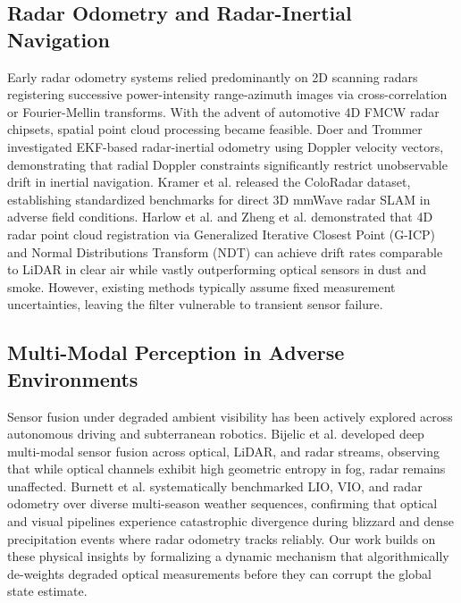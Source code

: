 \documentclass[lettersize,journal]{IEEEtran}
\begin{document}
\subsection{Radar Odometry and Radar-Inertial Navigation}
Early radar odometry systems relied predominantly on 2D scanning radars registering successive power-intensity range-azimuth images via cross-correlation or Fourier-Mellin transforms. 
With the advent of automotive 4D FMCW radar chipsets, spatial point cloud processing became feasible. 
Doer and Trommer \cite{doer2020inertial} investigated EKF-based radar-inertial odometry using Doppler velocity vectors, demonstrating that radial Doppler constraints significantly restrict unobservable drift in inertial navigation. 
Kramer et al. \cite{kramer2022coloradar} released the ColoRadar dataset, establishing standardized benchmarks for direct 3D mmWave radar SLAM in adverse field conditions. 
Harlow et al. \cite{harlow2023new} and Zheng et al. \cite{zheng20234d} demonstrated that 4D radar point cloud registration via Generalized Iterative Closest Point (G-ICP) and Normal Distributions Transform (NDT) can achieve drift rates comparable to LiDAR in clear air while vastly outperforming optical sensors in dust and smoke. 
However, existing methods typically assume fixed measurement uncertainties, leaving the filter vulnerable to transient sensor failure.

\subsection{Multi-Modal Perception in Adverse Environments}
Sensor fusion under degraded ambient visibility has been actively explored across autonomous driving and subterranean robotics. 
Bijelic et al. \cite{bijelic2020seeing} developed deep multi-modal sensor fusion across optical, LiDAR, and radar streams, observing that while optical channels exhibit high geometric entropy in fog, radar remains unaffected. 
Burnett et al. \cite{burnett2023boreas} systematically benchmarked LIO, VIO, and radar odometry over diverse multi-season weather sequences, confirming that optical and visual pipelines experience catastrophic divergence during blizzard and dense precipitation events where radar odometry tracks reliably. 
Our work builds on these physical insights by formalizing a dynamic mechanism that algorithmically de-weights degraded optical measurements before they can corrupt the global state estimate.
\end{document}
